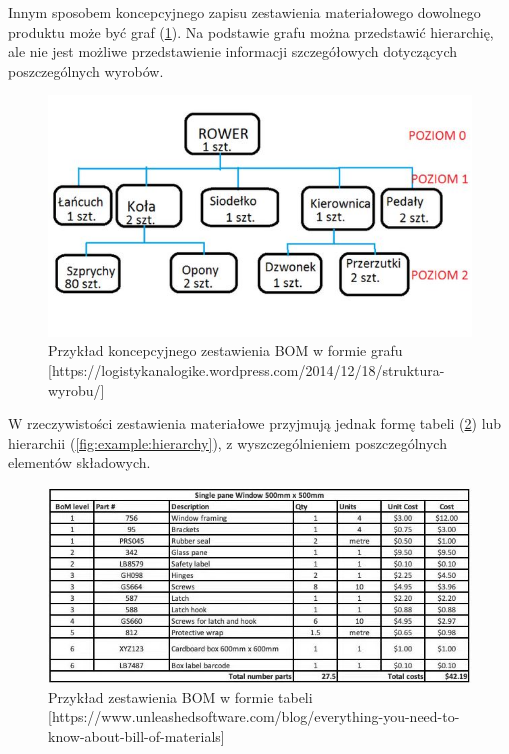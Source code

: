 \documentclass[12pt,twoside]{article}
\begin{document}
Innym sposobem koncepcyjnego zapisu zestawienia materiałowego dowolnego produktu może być graf (\ref{fig:example:graph}). Na podstawie grafu można przedstawić hierarchię, ale nie jest możliwe przedstawienie informacji szczegółowych dotyczących poszczególnych wyrobów.

\begin{figure}[h]
	\centering
	\includegraphics[width=\textwidth]{figures/examples/graph.jpg}
	\caption{Przykład koncepcyjnego zestawienia BOM w formie grafu [https://logistykanalogike.wordpress.com/2014/12/18/struktura-wyrobu/]}
\label{fig:example:graph}
\end{figure}

W rzeczywistości zestawienia materiałowe przyjmują jednak formę tabeli (\ref{fig:example:table}) lub hierarchii (\ref{fig:example:hierarchy}), z wyszczególnieniem poszczególnych elementów składowych.

\begin{figure}[h]
	\centering
	\includegraphics[width=\textwidth]{figures/examples/table.jpg}
	\caption{Przykład zestawienia BOM w formie tabeli [https://www.unleashedsoftware.com/blog/everything-you-need-to-know-about-bill-of-materials]}
\label{fig:example:table}
\end{figure}
\end{document}
